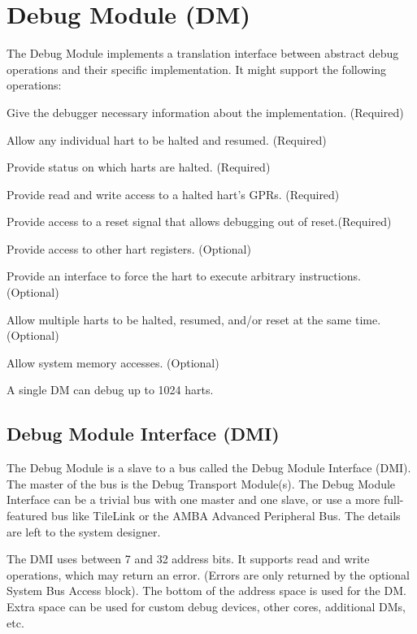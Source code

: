 
\chapter{Debug Module (DM)} \label{dm}

\begin{steps}{The Debug Module implements a translation interface between abstract debug
    operations and their specific implementation. It might support the following
    operations:}
\item Give the debugger necessary information about the implementation. (Required)
\item Allow any individual hart to be halted and resumed. (Required)
\item Provide status on which harts are halted. (Required)
\item Provide read and write access to a halted hart's GPRs. (Required)
\item Provide access to a reset signal that allows debugging out of reset.(Required)
\item Provide access to other hart registers. (Optional)
\item Provide an interface to force the hart to execute arbitrary instructions. (Optional)
\item Allow multiple harts to be halted, resumed, and/or reset at the same time. (Optional)
\item Allow system memory accesses. (Optional)
\end{steps}

A single DM can debug up to 1024 harts.

\section{Debug Module Interface (DMI)} \label{dmi}

The Debug Module is a slave to a bus called the Debug Module Interface (DMI). The
master of the bus is the Debug Transport Module(s).
The Debug Module Interface can be a trivial bus with one master and one slave,
or use a more full-featured bus like TileLink or the AMBA Advanced Peripheral
Bus. The details are left to the system designer.

The DMI uses between 7 and 32 address bits.  It supports read and write
operations, which may return an error. (Errors are only returned by the optional
System Bus Access block). The bottom of the address space is
used for the DM. Extra space can be used for custom debug devices, other cores,
additional DMs, etc.

